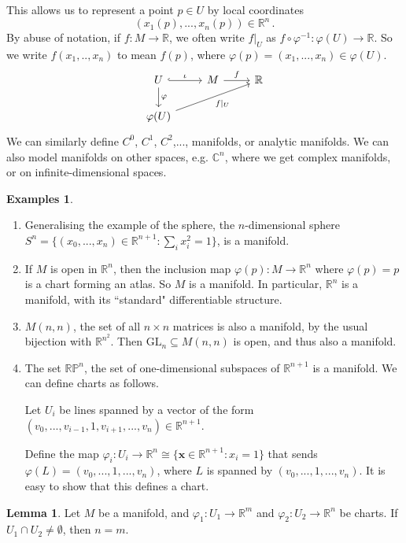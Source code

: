 \documentclass[a4paper,11pt]{article}
\theoremstyle{definition}
\newtheorem*{exs}{Examples}
\newtheorem*{lem}{Lemma}
\numberwithin{equation}{section}
\begin{document}
This allows us to represent a point $p\in U$ by local coordinates 
\[
(x_1(p),...,x_n(p))\in\mathbb{R}^n\,.
\]
By abuse of notation, if $f:M\rightarrow\mathbb{R}$, we often write $f|_U$ as $f\circ\varphi^{-1}:\varphi(U)\rightarrow\mathbb{R}$. So we write $f(x_1,..,x_n)$ to mean $f(p)$, where $\varphi(p)=(x_1,...,x_n)\in\varphi(U)$.
\[
\begin{tikzcd}
U\arrow{d}{\varphi}\arrow[hookrightarrow]{r}{\iota}&M\arrow{r}{f}&\mathbb{R}\\
\varphi(U)\arrow[swap]{urr}{f|_U}& &
\end{tikzcd}
\]
We can similarly define $C^0$, $C^1$, $C^2$,..., manifolds, or analytic manifolds. We can also model manifolds on other spaces, e.g. $\mathbb{C}^n$, where we get complex manifolds, or on infinite-dimensional spaces.

\begin{exs}
\leavevmode
\begin{enumerate}
    \item Generalising the example of the sphere, the $n$-dimensional sphere $S^n=\{(x_0,...,x_n)\in\mathbb{R}^{n+1}:\sum_i x_i^2=1\}$, is a manifold.
    \item If $M$ is open in $\mathbb{R}^n$, then the inclusion map $\varphi(p):M\rightarrow\mathbb{R}^n$ where $\varphi(p)=p$ is a chart forming an atlas. So $M$ is a manifold. In particular, $\mathbb{R}^n$ is a manifold, with its ``standard" differentiable structure.
    \item $M(n,n)$, the set of all $n\times n$ matrices is also a manifold, by the usual bijection with $\mathbb{R}^{n^2}$. Then $\text{GL}_n\subseteq M(n,n)$ is open, and thus also a manifold.
    \item The set $\mathbb{R}\mathbb{P}^n$, the set of one-dimensional subspaces of $\mathbb{R}^{n+1}$ is a manifold. We can define charts as follows.
    
    Let $U_i$ be lines spanned by a vector of the form $(v_0,...,v_{i-1},1,v_{i+1},...,v_n)\in\mathbb{R}^{n+1}$. 
    
    Define the map $\varphi_i:U_i\rightarrow\mathbb{R}^n\cong\{\mathbf{x}\in\mathbb{R}^{n+1}:x_i=1\}$ that sends $\varphi(L)=(v_0,...,1,...,v_n)$, where $L$ is spanned by $(v_0,...,1,...,v_n)$. It is easy to show that this defines a chart.
\end{enumerate}
\end{exs}

\begin{lem}
Let $M$ be a manifold, and $\varphi_1:U_1\rightarrow\mathbb{R}^m$ and $\varphi_2:U_2\rightarrow\mathbb{R}^n$ be charts. If $U_1\cap U_2\neq\emptyset$, then $n=m$.
\end{lem}
\end{document}
